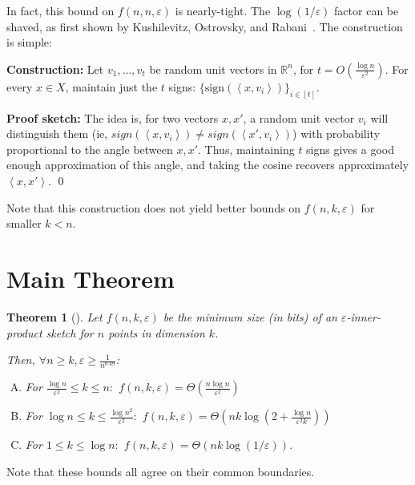 \documentclass[11pt]{article}
\newcommand{\eps}{\varepsilon}
\newcommand{\innp}[1]{\left\langle #1 \right\rangle}
\newcommand{\R}{\mathbb{R}}
\newcommand{\1}{\mathbbm{1}}
\newtheorem{theorem}{Theorem}
\begin{document}
In fact, this bound on $f(n, n, \eps)$ is nearly-tight.
The $\log(1/\eps)$ factor can be shaved, as first shown by
Kushilevitz, Ostrovsky, and Rabani~\cite{Kushilevitz}.
The construction is simple:

{\bf Construction:} Let $v_1, \dots, v_t$ be random unit vectors in $\R^n$, for
$t = O(\frac{\log n}{\eps^2})$.
For every $x \in X$, maintain just the $t$ signs:
$\{\text{sign}(\innp{x, v_i})\}_{i \in [t]}$.

{\bf Proof sketch:}
The idea is, for two vectors $x, x'$, a random unit vector $v_i$ will
distinguish them (ie, $sign(\innp{x, v_i}) \neq sign(\innp{x', v_i})$)
with probability proportional to the angle between $x, x'$.
Thus, maintaining $t$ signs gives a good enough approximation of this angle,
and taking the cosine recovers approximately $\innp{x, x'}$.
\qed

Note that this construction does not yield better bounds on $f(n, k, \eps)$
for smaller $k < n$.

\section{Main Theorem}

\begin{theorem}[\cite{alonFOCS}]
Let $f(n, k, \eps)$ be the minimum size (in bits) of an
$\eps$-inner-product sketch for $n$ points in dimension $k$.

Then, $\forall n \geq k, \eps \geq \frac{1}{n^{0.49}}$:
    \begin{enumerate}[(A)]
        \item For $\frac{\log n}{\eps^2} \leq k \leq n:$
            $f(n, k, \eps) = \Theta(\frac{n\log n}{\eps^2})$
        \item For $\log n \leq k \leq \frac{\log n^2}{\eps^2}:$
            $f(n, k, \eps) = \Theta(nk \log(2+\frac{\log n}{\eps^2k}))$
        \item For $1 \leq k \leq \log n:$
            $f(n, k, \eps) = \Theta(nk \log(1/\eps))$.
    \end{enumerate}

\end{theorem}
Note that these bounds all agree on their common boundaries.
\end{document}
